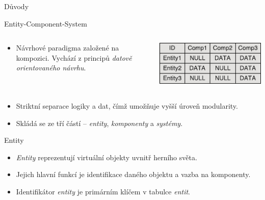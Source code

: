 \documentclass[final,hyperref={pdfpagelabels=false}]{beamer}
\begin{document}
\begin{frame}[t, fragile]
\begin{columns}[t]
\begin{column}{.465\textwidth}
\begin{block}{Důvody}
\end{block}


\begin{block}{Entity-Component-System}
	
	\begin{columns}
		\begin{column}{0.6\textwidth}
			\begin{itemize}
				\item Návrhové paradigma založené na kompozici. Vychází z principů \emph{datově orientovaného návrhu}.
			\end{itemize}
		\end{column}
		\begin{column}{0.29\textwidth}
			\hspace{-2em} \includegraphics[width=1.2\linewidth]{BAC-POS0.pdf}
		\end{column}
	\end{columns}
	\begin{itemize}
		\item Striktní separace logiky a dat, čímž umožňuje vyšší úroveň modularity. 
		\item Skládá se ze tří částí -- \emph{entity}, \emph{komponenty} a \emph{systémy}.
	\end{itemize}

	
\end{block}


\begin{block}{Entity}
	
	\begin{itemize}
		\item \emph{Entity} reprezentují virtuální objekty uvnitř herního světa.
		\item Jejich hlavní funkcí je identifikace daného objektu a vazba na komponenty.
		\item Identifikátor \emph{entity} je primárním klíčem v tabulce \emph{entit}.
	\end{itemize}
	

\end{block}
\end{column}
\end{columns}
\end{frame}
\end{document}
